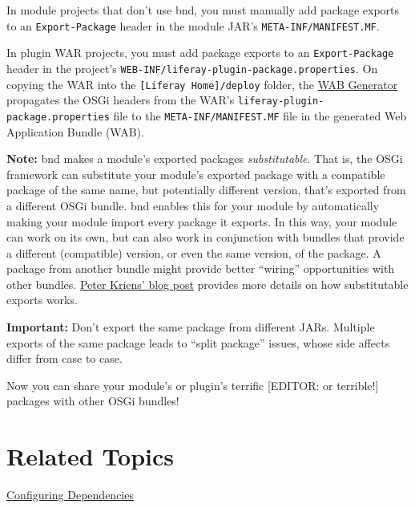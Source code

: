 In module projects that don't use bnd, you must manually add package
exports to an \texttt{Export-Package} header in the module JAR's
\texttt{META-INF/MANIFEST.MF}.

In plugin WAR projects, you must add package exports to an
\texttt{Export-Package} header in the project's
\texttt{WEB-INF/liferay-plugin-package.properties}. On copying the WAR
into the \texttt{{[}Liferay\ Home{]}/deploy} folder, the
\href{/docs/7-2/customization/-/knowledge_base/c/deploying-wars-wab-generator}{WAB
Generator} propagates the OSGi headers from the WAR's
\texttt{liferay-plugin-package.properties} file to the
\texttt{META-INF/MANIFEST.MF} file in the generated Web Application
Bundle (WAB).

\noindent\hrulefill

\textbf{Note:} bnd makes a module's exported packages
\emph{substitutable}. That is, the OSGi framework can substitute your
module's exported package with a compatible package of the same name,
but potentially different version, that's exported from a different OSGi
bundle. bnd enables this for your module by automatically making your
module import every package it exports. In this way, your module can
work on its own, but can also work in conjunction with bundles that
provide a different (compatible) version, or even the same version, of
the package. A package from another bundle might provide better
``wiring'' opportunities with other bundles.
\href{http://blog.osgi.org/2007/04/importance-of-exporting-nd-importing.html}{Peter
Kriens' blog post} provides more details on how substitutable exports
works.

\noindent\hrulefill

\noindent\hrulefill

\textbf{Important:} Don't export the same package from different JARs.
Multiple exports of the same package leads to ``split package'' issues,
whose side affects differ from case to case.

\noindent\hrulefill

Now you can share your module's or plugin's terrific {[}EDITOR: or
terrible!{]} packages with other OSGi bundles!

\section{Related Topics}\label{related-topics-5}

\href{/docs/7-2/customization/-/knowledge_base/c/configuring-dependencies}{Configuring
Dependencies}

